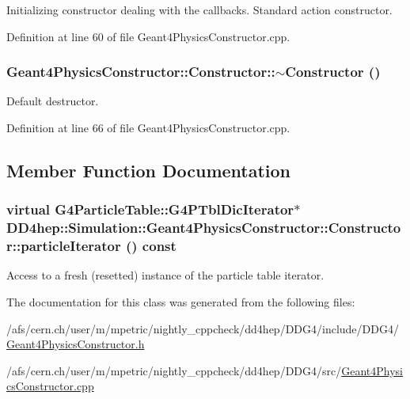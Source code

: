 Initializing constructor dealing with the callbacks. Standard action constructor. 

Definition at line 60 of file Geant4PhysicsConstructor.cpp.\hypertarget{class_d_d4hep_1_1_simulation_1_1_geant4_physics_constructor_1_1_constructor_a9b97bd3101cbf16f3ff03b382763c3a0}{
\subsubsection[{$\sim$Constructor}]{\setlength{\rightskip}{0pt plus 5cm}Geant4PhysicsConstructor::Constructor::$\sim$Constructor ()}}
\label{class_d_d4hep_1_1_simulation_1_1_geant4_physics_constructor_1_1_constructor_a9b97bd3101cbf16f3ff03b382763c3a0}


Default destructor. 

Definition at line 66 of file Geant4PhysicsConstructor.cpp.

\subsection{Member Function Documentation}
\hypertarget{class_d_d4hep_1_1_simulation_1_1_geant4_physics_constructor_1_1_constructor_a53dfd498fc3e9a35224537d9706849d7}{
\subsubsection[{particleIterator}]{\setlength{\rightskip}{0pt plus 5cm}virtual G4ParticleTable::G4PTblDicIterator$\ast$ DD4hep::Simulation::Geant4PhysicsConstructor::Constructor::particleIterator () const}}
\label{class_d_d4hep_1_1_simulation_1_1_geant4_physics_constructor_1_1_constructor_a53dfd498fc3e9a35224537d9706849d7}


Access to a fresh (resetted) instance of the particle table iterator. 

The documentation for this class was generated from the following files:\begin{DoxyCompactItemize}
\item 
/afs/cern.ch/user/m/mpetric/nightly\_\-cppcheck/dd4hep/DDG4/include/DDG4/\hyperlink{_geant4_physics_constructor_8h}{Geant4PhysicsConstructor.h}\item 
/afs/cern.ch/user/m/mpetric/nightly\_\-cppcheck/dd4hep/DDG4/src/\hyperlink{_geant4_physics_constructor_8cpp}{Geant4PhysicsConstructor.cpp}\end{DoxyCompactItemize}
